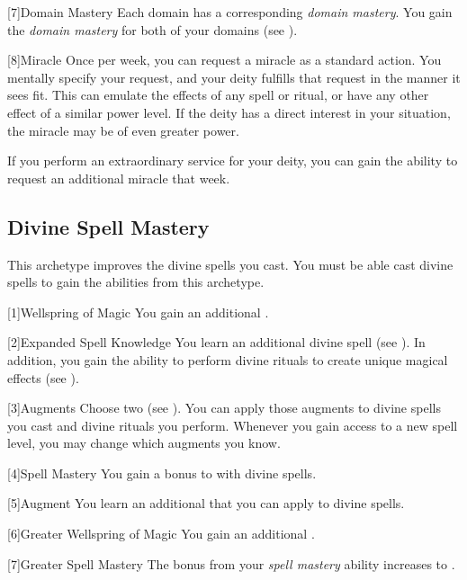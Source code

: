         [7]{Domain Mastery}
        Each domain has a corresponding \textit{domain mastery}.
        You gain the \textit{domain mastery} for both of your domains (see ).

        [8]{Miracle}
        Once per week, you can request a miracle as a standard action.
        You mentally specify your request, and your deity fulfills that request in the manner it sees fit.
        This can emulate the effects of any spell or ritual, or have any other effect of a similar power level.
        If the deity has a direct interest in your situation, the miracle may be of even greater power.

        If you perform an extraordinary service for your deity, you can gain the ability to request an additional miracle that week.

    \subsection{Divine Spell Mastery}
        This archetype improves the divine spells you cast.
        You must be able cast divine spells to gain the abilities from this archetype.

        [1]{Wellspring of Magic}
        You gain an additional .

        [2]{Expanded Spell Knowledge}
        You learn an additional divine spell (see ).
        In addition, you gain the ability to perform divine rituals to create unique magical effects (see ).

        [3]{Augments}
        Choose two  (see ).
        You can apply those augments to divine spells you cast and divine rituals you perform.
        Whenever you gain access to a new spell level, you may change which augments you know.

        [4]{Spell Mastery}
        You gain a  bonus to  with divine spells.

        [5]{Augment}
        You learn an additional  that you can apply to divine spells.

        [6]{Greater Wellspring of Magic}
        You gain an additional .

        [7]{Greater Spell Mastery} 
        The bonus from your \textit{spell mastery} ability increases to .

